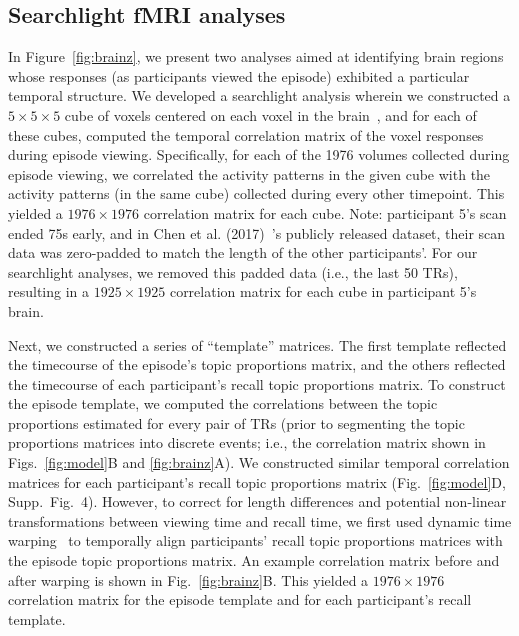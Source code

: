 \documentclass[10pt]{article}
\newcommand{\corrmats}{4}
\begin{document}
\subsection*{Searchlight fMRI analyses}
In Figure~\ref{fig:brainz}, we present two analyses aimed at identifying brain regions whose responses (as participants viewed the episode) exhibited a particular temporal structure.  We developed a searchlight analysis wherein we constructed a $5 \times 5 \times 5$ cube of voxels centered on each voxel in the brain~\citep{ChenEtal17}, and for each of these cubes, computed the temporal correlation matrix of the voxel responses during episode viewing.  Specifically, for each of the 1976 volumes collected during episode viewing, we correlated the activity patterns in the given cube with the activity patterns (in the same cube) collected during every other timepoint.  This yielded a $1976 \times 1976$ correlation matrix for each cube.  Note: participant 5's scan ended 75s early, and in Chen et al. (2017)~\cite{ChenEtal17}'s publicly released dataset, their scan data was zero-padded to match the length of the other participants'.  For our searchlight analyses, we removed this padded data (i.e., the last 50 TRs), resulting in a $1925 \times 1925$ correlation matrix for each cube in participant 5's brain.

Next, we constructed a series of ``template'' matrices.  The first template reflected the timecourse of the episode's topic proportions matrix, and the others reflected the timecourse of each participant's recall topic proportions matrix.  To construct the episode template, we computed the correlations between the topic proportions estimated for every pair of TRs (prior to segmenting the topic proportions matrices into discrete events; i.e., the correlation matrix shown in Figs.~\ref{fig:model}B and \ref{fig:brainz}A).  We constructed similar temporal correlation matrices for each participant's recall topic proportions matrix (Fig.~\ref{fig:model}D, Supp.\ Fig.~\corrmats).  However, to correct for length differences and potential non-linear transformations between viewing time and recall time, we first used dynamic time warping~\citep{BernClif94} to temporally align participants' recall topic proportions matrices with the episode topic proportions matrix.  An example correlation matrix before and after warping is shown in Fig.~\ref{fig:brainz}B.  This yielded a $1976 \times 1976$ correlation matrix for the episode template and for each participant's recall template.
\end{document}
